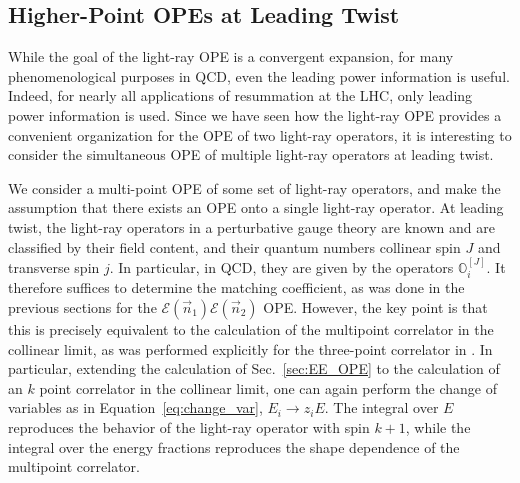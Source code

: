 \documentclass[letterpaper,11pt]{article}
\def\cE{\mathcal{E}}
\newcommand{\Eq}[1]{Equation~\eqref{#1}}
\DeclareRobustCommand{\Sec}[1]{Sec.~\ref{#1}}
\DeclareRobustCommand{\Eq}[1]{Eq.~(\ref{#1})}
\begin{document}
\subsection{Higher-Point OPEs at Leading Twist}\label{sec:comments}

While the goal of the light-ray OPE is a convergent expansion, for many phenomenological purposes in QCD, even the leading power information is useful. Indeed, for nearly all applications of resummation at the LHC, only leading power information is used. Since we have seen how the light-ray OPE provides a convenient organization for the OPE of two light-ray operators, it is interesting to consider the simultaneous OPE of multiple light-ray operators at leading twist.

We consider a multi-point OPE of some set of light-ray operators, and make the assumption that there exists an OPE onto a single light-ray operator. At leading twist, the light-ray operators in a perturbative gauge theory are known and are classified by their field content, and their quantum numbers collinear spin $J$ and transverse spin $j$. In particular, in QCD, they are given by the operators $\mathbb{O}_i^{[J]}$. It therefore suffices to determine the matching coefficient, as was done in the previous sections for the $\cE(\vec n_1) \cE(\vec n_2)$ OPE. However, the key point is that this is precisely equivalent to the calculation of the multipoint correlator in the collinear limit, as was performed explicitly for the three-point correlator in  \cite{Chen:2019bpb}. In particular, extending the calculation of \Sec{sec:EE_OPE} to the calculation of an $k$ point correlator in the collinear limit, one can again perform the change of variables as in \Eq{eq:change_var}, $E_i \to z_i E$. The integral over $E$ reproduces the behavior of the light-ray operator with spin $k+1$, while the integral over the energy fractions reproduces the shape dependence of the multipoint correlator. 
\end{document}
